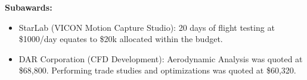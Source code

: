 \documentclass[11pt]{article}
\begin{document}
{\bf Subawards:}
\begin{itemize}
\item StarLab (VICON Motion Capture Studio): 20 days of flight testing at \$1000/day equates to \$20k allocated within the budget.
\item DAR Corporation (CFD Development): Aerodynamic Analysis was quoted at \$68,800.  Performing trade studies and optimizations was quoted at \$60,320.
\end{itemize}
\end{document}
